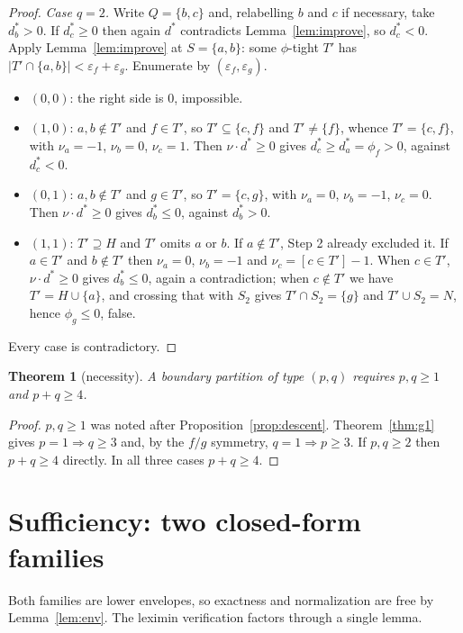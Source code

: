 \documentclass[11pt]{article}
\newtheorem{theorem}{Theorem}
\begin{document}
\begin{proof}
\emph{Case $q=2$.}  Write $Q=\{b,c\}$ and, relabelling $b$ and $c$ if
necessary, take $d^\ast_b>0$.  If $d^\ast_c\ge0$ then again $d^\ast$
contradicts Lemma~\ref{lem:improve}, so $d^\ast_c<0$.  Apply
Lemma~\ref{lem:improve} at $S=\{a,b\}$: some $\phi$-tight $T'$ has
$|T'\cap\{a,b\}|<\varepsilon_f+\varepsilon_g$.  Enumerate by
$(\varepsilon_f,\varepsilon_g)$.
\begin{itemize}[nosep]
\item $(0,0)$: the right side is $0$, impossible.
\item $(1,0)$: $a,b\notin T'$ and $f\in T'$, so $T'\subseteq\{c,f\}$ and
      $T'\ne\{f\}$, whence $T'=\{c,f\}$, with $\nu_a=-1$, $\nu_b=0$,
      $\nu_c=1$.  Then $\nu\cdot d^\ast\ge0$ gives
      $d^\ast_c\ge d^\ast_a=\phi_f>0$, against $d^\ast_c<0$.
\item $(0,1)$: $a,b\notin T'$ and $g\in T'$, so $T'=\{c,g\}$, with $\nu_a=0$,
      $\nu_b=-1$, $\nu_c=0$.  Then $\nu\cdot d^\ast\ge0$ gives
      $d^\ast_b\le0$, against $d^\ast_b>0$.
\item $(1,1)$: $T'\supseteq H$ and $T'$ omits $a$ or $b$.  If $a\notin T'$,
      Step 2 already excluded it.  If $a\in T'$ and $b\notin T'$ then
      $\nu_a=0$, $\nu_b=-1$ and $\nu_c=[c\in T']-1$.  When $c\in T'$,
      $\nu\cdot d^\ast\ge0$ gives $d^\ast_b\le0$, again a contradiction; when
      $c\notin T'$ we have $T'=H\cup\{a\}$, and crossing that with $S_2$ gives
      $T'\cap S_2=\{g\}$ and $T'\cup S_2=N$, hence $\phi_g\le0$, false.
\end{itemize}
Every case is contradictory.
\end{proof}

\begin{theorem}[necessity]\label{thm:necessity}
A boundary partition of type $(p,q)$ requires $p,q\ge1$ and $p+q\ge4$.
\end{theorem}

\begin{proof}
$p,q\ge1$ was noted after Proposition~\ref{prop:descent}.
Theorem~\ref{thm:g1} gives $p=1\Rightarrow q\ge3$ and, by the $f/g$ symmetry,
$q=1\Rightarrow p\ge3$.  If $p,q\ge2$ then $p+q\ge4$ directly.  In all three
cases $p+q\ge4$.
\end{proof}

\section{Sufficiency: two closed-form families}\label{sec:suf}

Both families are lower envelopes, so exactness and normalization are free by
Lemma~\ref{lem:env}.  The leximin verification factors through a single lemma.
\end{document}
